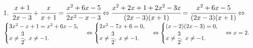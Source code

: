 1. $\cfrac{x+1}{2x-3}+\cfrac{x}{x+1}=\cfrac{x^2+6x-5}{2x^2-x-3}\Leftrightarrow \cfrac{x^2+2x+1+2x^2-3x}{(2x-3)(x+1)}=\cfrac{x^2+6x-5}{(2x-3)(x+1)}\Leftrightarrow$\\$
\begin{cases} 3x^2-x+1=x^2+6x-5,\\ x\neq\cfrac{3}{2},\ x\neq-1.\end{cases}\Leftrightarrow
\begin{cases} 2x^2-7x+6=0,\\ x\neq\cfrac{3}{2},\ x\neq-1.\end{cases}\Leftrightarrow
\begin{cases} (x-2)(2x-3)=0,\\ x\neq\cfrac{3}{2},\ x\neq-1.\end{cases}\Leftrightarrow x=2.$\\
